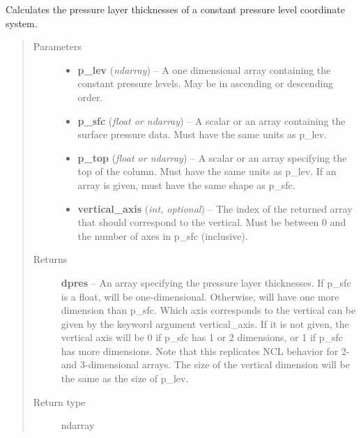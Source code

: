 \documentclass[letterpaper,10pt,english]{sphinxmanual}
\begin{document}
\begin{fulllineitems}
\label{atmos:atmos.util.dpres_isobaric}
Calculates the pressure layer thicknesses of a constant pressure level
coordinate system.
\begin{quote}\begin{description}
\item[{Parameters}] \leavevmode\begin{itemize}
\item {} 
\textbf{p\_lev} (\emph{ndarray}) -- A one dimensional array containing the constant pressure levels. May
be in ascending or descending order.

\item {} 
\textbf{p\_sfc} (\emph{float or ndarray}) -- A scalar or an array containing the surface pressure data. Must have
the same units as p\_lev.

\item {} 
\textbf{p\_top} (\emph{float or ndarray}) -- A scalar or an array specifying the top of the column. Must have the
same units as p\_lev. If an array is given, must have the same shape
as p\_sfc.

\item {} 
\textbf{vertical\_axis} (\emph{int, optional}) -- The index of the returned array that should correspond to the vertical.
Must be between 0 and the number of axes in p\_sfc (inclusive).

\end{itemize}

\item[{Returns}] \leavevmode
\textbf{dpres} --
An array specifying the pressure layer thicknesses. If p\_sfc is a
float, will be one-dimensional. Otherwise, will have one more dimension
than p\_sfc. Which axis corresponds to the vertical can be given by the
keyword argument vertical\_axis. If it is not given, the vertical axis
will be 0 if p\_sfc has 1 or 2 dimensions, or 1 if p\_sfc has more
dimensions. Note that this replicates NCL behavior for 2- and
3-dimensional arrays. The size of the vertical dimension will be the
same as the size of p\_lev.

\item[{Return type}] \leavevmode
ndarray

\end{description}\end{quote}



\end{fulllineitems}
\end{document}
